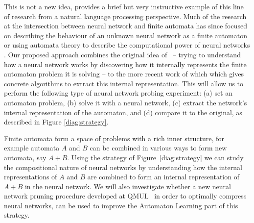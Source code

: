 \documentclass[11pt,a4paper]{article}
\begin{document}
	
	This is not a new idea, \cite{cleeremans1989finite} provides a brief but very instructive example of this line of research from a natural language processing perspective. Much of the research at the intersection between neural network and finite automata has since focused on describing the behaviour of an unknown neural network as a finite automaton \cite{weiss2018extracting,weiss2019learning} or using automata theory to describe the computational power of neural networks \cite{weiss2018practical}. Our proposed approach combines the original idea of~\cite{cleeremans1989finite} -- trying to understand how a neural network works by discovering how it internally represents the finite automaton problem it is solving -- to the more recent work of \cite{weiss2018extracting,weiss2019learning} which which gives concrete algorithms to extract this internal representation. This will allow us to perform the following type of neural network probing experiment: (a) set an automaton problem, (b) solve it with a neural network, (c) extract the network's internal representation of the automaton, and (d) compare it to the original, as described in Figure \ref{diag:strategy}. 
	
	
	Finite automata form a space of problems with a rich inner structure, for example automata $A$ and $B$ can be combined in various ways to form new automata, say $A+B$. Using the strategy of Figure~\ref{diag:strategy} we can study the compositional nature of neural networks by understanding how the internal representations of $A$ and $B$ are combined to form an internal representation of $A+B$ in the neural network. We will also investigate whether a new neural network pruning procedure developed at QMUL~\cite{pruning} in order to optimally compress neural networks, can be used to improve the Automaton Learning part of this strategy.	
	
	
	
\end{document}
